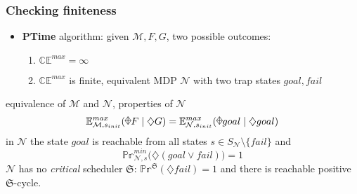 \documentclass[onlymath]{beamer}
\begin{document}
\begin{frame}
	\frametitle{Checking finiteness}
	\begin{itemize}
		\item \textbf{PTime} algorithm: given $\mathcal{M}, F, G$, two possible outcomes:
		\begin{enumerate}[(1)]
			\item $\mathbb{CE}^{max} = \infty$
			\item $\mathbb{CE}^{max}$ is finite, equivalent MDP $\mathcal{N}$ with two trap states $goal, fail$
		\end{enumerate}
	\end{itemize}
\pause
\begin{block}{equivalence of $\mathcal{M}$ and $\mathcal{N}$, properties of $\mathcal{N}$}
	\[
		\mathbb{E}_{\mathcal{M},s_{init}}^{max} (\rawdiaplus F \mid \diamondsuit G) = \mathbb{E}_{\mathcal{N},s_{init}}^{max} (\rawdiaplus goal \mid \diamondsuit goal)
	\]
	\pause
	in $\mathcal{N}$ the state $goal$ is reachable from all states $s \in S_\mathcal{N} \setminus \{fail\}$ and \[
		\mathbb{Pr}_{\mathcal{N},s}^{min}\Big(\diamondsuit(goal \lor fail)\Big) = 1
	\]
	\pause
	$\mathcal{N}$ has no \textit{critical} scheduler $\mathfrak{S}$: $\mathbb{Pr}^{\mathfrak{S}}(\diamondsuit fail) = 1$ and there is reachable positive $\mathfrak{S}$-cycle.
\end{block}

\end{frame}
\end{document}
